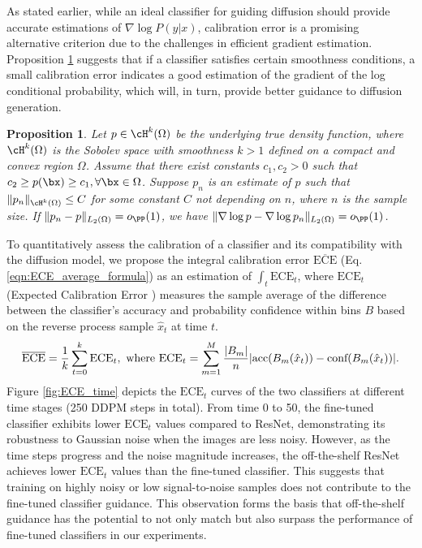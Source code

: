 \documentclass{article}
\newtheorem{proposition}[theorem]{Proposition}
\theoremstyle{definition}
\begin{document}
  
As stated earlier, while an ideal classifier for guiding diffusion should provide accurate estimations of $\nabla\log P(y|x)$, calibration error is a promising alternative criterion due to the challenges in efficient gradient estimation. 
Proposition \ref{prop} suggests that if a classifier satisfies certain smoothness conditions, a small calibration error indicates a good estimation of the gradient of the log conditional probability, which will, in turn, provide better guidance to diffusion generation. 

\begin{proposition}\label{prop}
    Let $p\in \cH^k(\Omega)$ be the underlying true density function, where $\cH^k(\Omega)$ is the Sobolev space with smoothness $k>1$ defined on a compact and convex region $\Omega$. Assume that there exist constants $c_1,c_2>0$ such that $c_2\geq p(\bx)\geq c_1, \forall \bx\in \Omega$. Suppose $p_n$ is an estimate of $p$ such that $\|p_n\|_{\cH^k(\Omega)} \leq C$ for some constant $C$ not depending on $n$, where $n$ is the sample size. If $\|p_n - p\|_{L_2(\Omega)} = o_{\PP}(1)$, we have $\|\nabla \log p - \nabla \log p_n\|_{L_2(\Omega)} = o_{\PP}(1)$.
\end{proposition}


To quantitatively assess the calibration of a classifier and its compatibility with the diffusion model, 
we propose the integral calibration error $\overline{\text{ECE}}$ (Eq.\ref{eqn:ECE_average_formula}) as an estimation of $\int_t \text{ECE}_t $, where $\text{ECE}_t$ (Expected Calibration Error \citep{naeini2015obtaining}) measures the sample average of the difference between the classifier's accuracy and probability confidence within bins $B$ based on the reverse process sample $\hat{x}_t$ at time $t$. 
\begin{equation}
\label{eqn:ECE_average_formula}
 \overline{\text{ECE}} = \frac{1}{k}\sum_{t=0}^{k} \text{ECE}_t, \text{ where }\text{ECE}_t = \sum^{M}_{m=1} \frac{|B_m|}{n} |\text{acc}(B_m(\hat{x}_t)) - \text{conf}(B_m(\hat{x}_t)) |. \\ 
\end{equation}
Figure \ref{fig:ECE_time} depicts the $\text{ECE}_t$ curves of the two classifiers at different time stages (250 DDPM steps in total). From time 0 to 50, the fine-tuned classifier exhibits lower $\text{ECE}_t$ values compared to ResNet, demonstrating its robustness to Gaussian noise when the images are less noisy. However, as the time steps progress and the noise magnitude increases, the off-the-shelf ResNet achieves lower $\text{ECE}_t$ values than the fine-tuned classifier. This suggests that training on highly noisy or low signal-to-noise samples does not contribute to the fine-tuned classifier guidance. This observation forms the basis that off-the-shelf guidance has the potential to not only match but also surpass the performance of fine-tuned classifiers in our experiments. 
\end{document}
